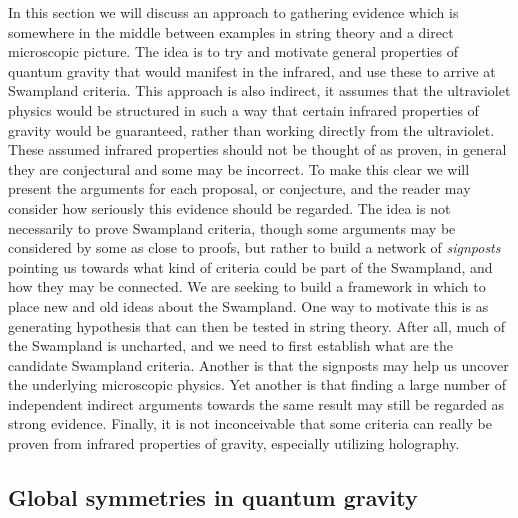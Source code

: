 \documentclass[11pt,a4paper]{article}
\numberwithin{equation}{section}
\numberwithin{table}{section}\setlength{\multlinegap}{25pt}
\begin{document}
In this section we will discuss an approach to gathering evidence which is somewhere in the middle between examples in string theory and a direct microscopic picture. The idea is to try and motivate general properties of quantum gravity that would manifest in the infrared, and use these to arrive at Swampland criteria. This approach is also indirect, it assumes that the ultraviolet physics would be structured in such a way that certain infrared properties of gravity would be guaranteed, rather than working directly from the ultraviolet. These assumed infrared properties should not be thought of as proven, in general they are conjectural and some may be incorrect. To make this clear we will present the arguments for each proposal, or conjecture, and the reader may consider how seriously this evidence should be regarded. The idea is not necessarily to prove Swampland criteria, though some arguments may be considered by some as close to proofs, but rather to build a network of {\it signposts} pointing us towards what kind of criteria could be part of the Swampland, and how they may be connected. We are seeking to build a framework in which to place new and old ideas about the Swampland. One way to motivate this is as generating hypothesis that can then be tested in string theory. After all, much of the Swampland is uncharted, and we need to first establish what are the candidate Swampland criteria. Another is that the signposts may help us uncover the underlying microscopic physics. Yet another is that finding a large number of independent indirect arguments towards the same result may still be regarded as strong evidence. Finally, it is not inconceivable that some criteria can really be proven from infrared properties of gravity, especially utilizing holography.



\subsection{Global symmetries in quantum gravity}
\end{document}
